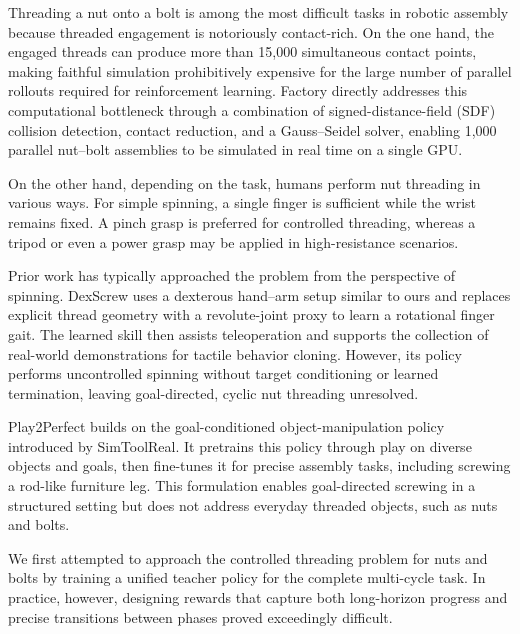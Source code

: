 
Threading a nut onto a bolt is among the most difficult tasks in robotic
assembly because threaded engagement is notoriously contact-rich. On the one
hand, the engaged threads can produce more than 15,000 simultaneous contact
points, making faithful simulation prohibitively expensive for the large number
of parallel rollouts required for reinforcement learning.
Factory\cite{narang2022factory}
directly addresses this computational bottleneck through a combination of
signed-distance-field (SDF)\cite{macklin2020local} collision detection, contact reduction, and a
Gauss--Seidel solver, enabling 1,000 parallel nut--bolt assemblies to be
simulated in real time on a single GPU.

On the other hand, depending on the task, humans perform nut threading in
various ways. For simple spinning, a single finger is sufficient while the
wrist remains fixed. A pinch grasp is preferred for controlled threading,
whereas a tripod or even a power grasp may be applied in high-resistance
scenarios.

Prior work has typically approached the problem from the perspective of
spinning. DexScrew\cite{dexscrew} uses a dexterous hand--arm setup similar to ours and replaces
explicit thread geometry with a revolute-joint proxy to learn a rotational
finger gait. The learned skill then assists teleoperation and supports the
collection of real-world demonstrations for tactile behavior cloning. However,
its policy performs uncontrolled spinning
without target conditioning or learned termination, leaving goal-directed,
cyclic nut threading unresolved.

Play2Perfect\cite{play2perfect} builds on the goal-conditioned
object-manipulation policy introduced by SimToolReal\cite{simtoolreal}. It
pretrains this policy through play on diverse objects and goals, then fine-tunes
it for precise assembly tasks, including screwing a rod-like furniture leg.
This formulation enables goal-directed screwing in a structured setting but
does not address everyday threaded objects, such as nuts and bolts.

We first attempted to approach the controlled threading problem for nuts and bolts
by training a unified teacher policy for the complete
multi-cycle task. In practice, however, designing rewards that capture both
long-horizon progress and precise transitions between phases proved exceedingly
difficult.

